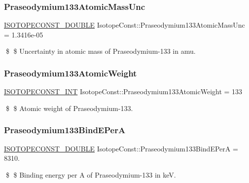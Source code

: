 \subsubsection{\texorpdfstring{Praseodymium133\+Atomic\+Mass\+Unc}{Praseodymium133AtomicMassUnc}}
{\footnotesize\ttfamily \mbox{\hyperlink{group___isotope_const-_macros_ga8f45a7272ce02c0b4c65c44636ed719a}{I\+S\+O\+T\+O\+P\+E\+C\+O\+N\+S\+T\+\_\+\+D\+O\+U\+B\+LE}} Isotope\+Const\+::\+Praseodymium133\+Atomic\+Mass\+Unc = 1.\+3416e-\/05}

\$ \$ Uncertainty in atomic mass of Praseodymium-\/133 in amu. \mbox{\label{group___isotope_const-_praseodymium-_pr133_gaaea3d297ee72ce7ef88822f1b24996fe}} 
\subsubsection{\texorpdfstring{Praseodymium133\+Atomic\+Weight}{Praseodymium133AtomicWeight}}
{\footnotesize\ttfamily \mbox{\hyperlink{group___isotope_const-_macros_ga5f18360b3e99483a35c32d789e62621c}{I\+S\+O\+T\+O\+P\+E\+C\+O\+N\+S\+T\+\_\+\+I\+NT}} Isotope\+Const\+::\+Praseodymium133\+Atomic\+Weight = 133}

\$ \$ Atomic weight of Praseodymium-\/133. \mbox{\label{group___isotope_const-_praseodymium-_pr133_ga821de70f8f91e3515345f0ead1835be4}} 
\subsubsection{\texorpdfstring{Praseodymium133\+Bind\+E\+PerA}{Praseodymium133BindEPerA}}
{\footnotesize\ttfamily \mbox{\hyperlink{group___isotope_const-_macros_ga8f45a7272ce02c0b4c65c44636ed719a}{I\+S\+O\+T\+O\+P\+E\+C\+O\+N\+S\+T\+\_\+\+D\+O\+U\+B\+LE}} Isotope\+Const\+::\+Praseodymium133\+Bind\+E\+PerA = 8310.}

\$ \$ Binding energy per A of Praseodymium-\/133 in keV. \mbox{\label{group___isotope_const-_praseodymium-_pr133_ga7a0d1f34fd39a7a2bcc9893e132b150b}} 
